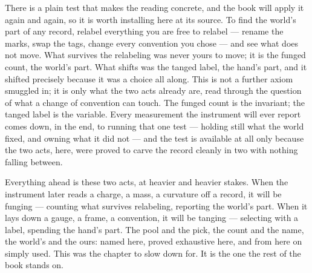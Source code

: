 There is a plain test that makes the reading concrete, and the book will apply it again and again, so it is worth
installing here at its source. To find the world's part of any record, relabel everything you are free to relabel
--- rename the marks, swap the tags, change every convention you chose --- and see what does not move. What
survives the relabeling was never yours to move; it is the funged count, the world's part. What shifts was the
tanged label, the hand's part, and it shifted precisely because it was a choice all along. This is not a further
axiom smuggled in; it is only what the two acts already are, read through the question of what a change of
convention can touch. The funged count is the invariant; the tanged label is the variable. Every measurement the
instrument will ever report comes down, in the end, to running that one test --- holding still what the world
fixed, and owning what it did not --- and the test is available at all only because the two acts, here, were
proved to carve the record cleanly in two with nothing falling between.

Everything ahead is these two acts, at heavier and heavier stakes. When the instrument later reads a charge, a
mass, a curvature off a record, it will be funging --- counting what survives relabeling, reporting the world's
part. When it lays down a gauge, a frame, a convention, it will be tanging --- selecting with a label, spending
the hand's part. The pool and the pick, the count and the name, the world's and the ours: named here, proved
exhaustive here, and from here on simply used. This was the chapter to slow down for. It is the one the rest of
the book stands on.
